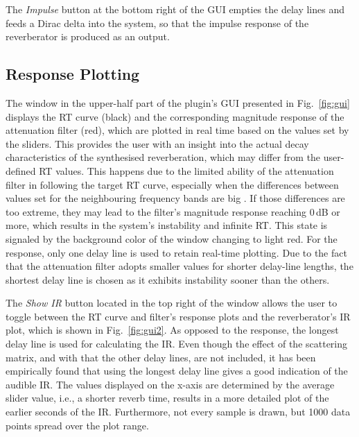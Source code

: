 \documentclass[twoside,a4paper]{article}
\begin{document}
The \textit{Impulse} button at the bottom right of the GUI empties the delay lines and feeds a Dirac delta into the system, so that the impulse response of the reverberator is produced as an output.





\subsection{Response Plotting}
The window in the upper-half part of the plugin's GUI presented in Fig.~\ref{fig:gui} displays the RT curve (black) and the corresponding magnitude response of the attenuation filter (red), which are plotted in real time based on the values set by the sliders. This provides the user with an insight into the actual decay characteristics of the synthesised reverberation, which may differ from the user-defined RT values. This happens due to the limited ability of the attenuation filter in following the target RT curve, especially when the differences between values set for the neighbouring frequency bands are big \cite{prawda:2019:improved}. If those differences are too extreme, they may lead to the filter's magnitude response reaching 0\,dB or more, which results in the system's instability and infinite RT. This state is signaled by the background color of the window changing to light red. For the response, only one delay line is used to retain real-time plotting. Due to the fact that the attenuation filter adopts smaller values for shorter delay-line lengths, the shortest delay line is chosen as it exhibits instability sooner than the others.  


The \textit{Show IR} button located in the top right of the window allows the user to toggle between the RT curve and filter's response plots and the reverberator's IR plot, which is shown in Fig.~\ref{fig:gui2}. As opposed to the response, the longest delay line is used for calculating the IR. Even though the effect of the scattering matrix, and with that the other delay lines, are not included, it has been empirically found that using the longest delay line gives a good indication of the audible IR. The values displayed on the x-axis are determined by the average slider value, i.e., a shorter reverb time, results in a more detailed plot of the earlier seconds of the IR. Furthermore, not every sample is drawn, but 1000 data points spread over the plot range.
\end{document}
